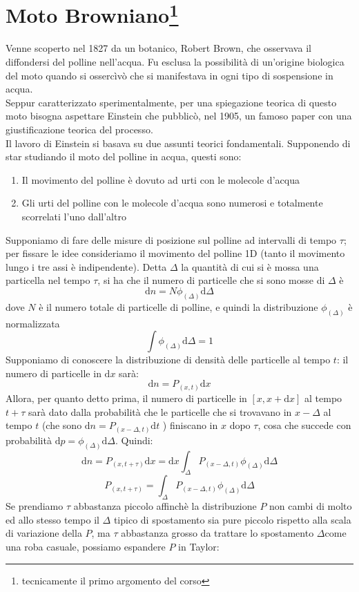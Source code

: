 \documentclass[a4paper,12pt]{article}
\renewcommand{\arg}[1]{_{(#1)}}
\theoremstyle{plain}
\theoremstyle{definition}
\renewcommand{\d}{\text{d}}
\theoremstyle{remark}
\begin{document}
	\section{Moto Browniano\footnote{tecnicamente il primo argomento del corso}}
	\label{Browniano}
	Venne scoperto nel 1827 da un botanico, Robert Brown, che osservava il diffondersi del polline nell'acqua. Fu esclusa la possibilità di un'origine biologica del moto quando si ossercìvò che si manifestava in ogni tipo di sospensione in acqua.
	\\Seppur caratterizzato sperimentalmente, per una spiegazione teorica di questo moto bisogna aspettare Einstein che pubblicò, nel 1905, un famoso paper con una giustificazione teorica del processo.\\
	Il lavoro di Einstein si basava su due assunti teorici fondamentali. Supponendo di star studiando il moto del polline in acqua, questi sono:
	\begin{enumerate}
		\item Il movimento del polline è dovuto ad urti con le molecole d'acqua
		\item  Gli urti del polline con le molecole d'acqua sono numerosi e totalmente scorrelati l'uno dall'altro
	\end{enumerate}
	Supponiamo di fare delle misure di posizione sul polline ad intervalli di tempo $\tau$; per fissare le idee consideriamo il movimento del polline 1D (tanto il movimento lungo i tre assi è indipendente). Detta $\Delta$ la quantità di cui si è mossa una particella nel tempo $\tau$, si ha che il numero di particelle che si sono mosse di $\Delta$ è
	\[\d n=N \phi\arg{\Delta} \d \Delta		\]
	dove $N$ è il numero totale di particelle di polline, e quindi la distribuzione $\phi\arg{\Delta}	$ è normalizzata
	\[\int\phi\arg{\Delta}\d\Delta=1\]
	Supponiamo di conoscere la distribuzione di densità delle particelle al tempo $t$: il numero di particelle in $\d x$ sarà:
	\[\d n=P\arg{x,t} \d x 		\]
	Allora, per quanto detto prima, il numero di particelle in $[x,x+\d x]$ al tempo $t+\tau$ sarà dato dalla probabilità che le particelle che si trovavano in $x-\Delta$ al tempo $t$ (che sono $\d n=P\arg{x-\Delta,t} \d t 	$ ) finiscano in $x$ dopo $\tau$, cosa che succede con probabilità $\d p=\phi\arg{\Delta} \d \Delta$.
	Quindi:
	\[\d n=P\arg{x,t+\tau} \d x=\d x \int_\Delta P\arg{x-\Delta,t}  \phi\arg{\Delta} \d \Delta	\]
	\[P\arg{x,t+\tau} = \int_\Delta P\arg{x-\Delta,t}  \phi\arg{\Delta} \d \Delta\]
	Se prendiamo $\tau$ abbastanza piccolo affinchè la distribuzione $P$ non cambi di molto ed allo stesso tempo il $\Delta$ tipico di spostamento sia pure piccolo rispetto alla scala di variazione della $P$, ma $\tau$ abbastanza grosso da trattare lo spostamento $\Delta$come una roba casuale, possiamo espandere $P$ in Taylor:
\end{document}
